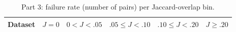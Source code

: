 \begin{table}[ht]\centering\small
\begin{tabular}{lrrrrr}\toprule
Dataset & $J{=}0$ & $0<J<.05$ & $.05\le J<.10$ & $.10\le J<.20$ & $J\ge.20$ \\ \midrule

\bottomrule\end{tabular}
\caption{Part 3: failure rate (number of pairs) per Jaccard-overlap bin.}\label{tab:p3bins}\end{table}

